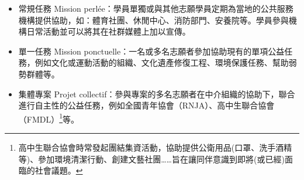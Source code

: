 \documentclass[a4paper,14pt]{extarticle}
\theoremstyle{plain}
\theoremstyle{remark}
\numberwithin{equation}{section}
\begin{document}
\begin{itemize}
	\item 常規任務 Mission perlée：學員單獨或與其他志願學員定期為當地的公共服務機構提供協助，如：體育社團、休閒中心、消防部門、安養院等。學員參與機構日常活動並可以將其在社群媒體上加以宣傳。




	\item



    單一任務 Mission ponctuelle：一名或多名志願者參加協助現有的單項公益任務，例如文化或運動活動的組織、文化遺產修復工程、環境保護任務、幫助弱勢群體等。


	\item

    集體專案 Projet collectif：參與專案的多名志願者在中介組織的協助下，聯合進行自主性的公益任務，例如全國青年協會（RNJA）、高中生聯合協會（FMDL）\footnote{高中生聯合協會時常發起團結集資活動，協助提供公衛用品(口罩、洗手酒精等)、參加環境清潔行動、創建文藝社團……旨在讓同伴意識到即將(或已經)面臨的社會議題。}等。


\end{itemize}
\end{document}
